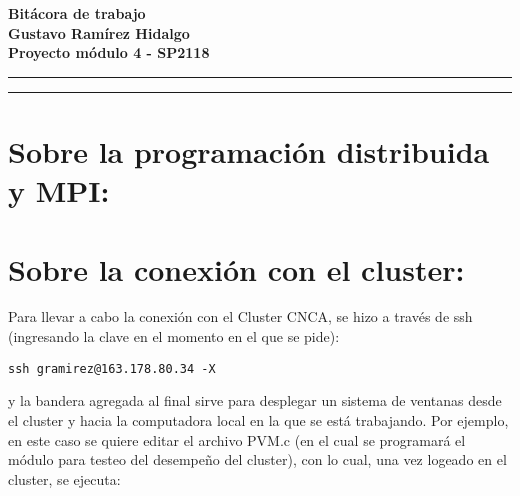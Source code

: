 \documentclass[letter]{article}
\newcommand{\entitle}[1]{
  \vspace{0.3cm}%
  \noindent%
  \textbf{#1}%
  \vspace{0.2cm}%
  \hrule\vspace*{0.5mm}%
  \noindent%
  \rule{\linewidth}{0.5mm}%
  \vspace{0.5cm}%
}%
\begin{document}

\newcommand{\uic}{blue} %
\newcommand{\uim}{\_\_} %
\newcommand{\userinput}[1]{\textcolor{\uic}{\uim#1\uim}}
























\begin{center}
\entitle{Bitácora de trabajo \\ Gustavo Ramírez Hidalgo \\ Proyecto módulo 4 - SP2118}
\end{center}







\section{\normalsize Sobre la programación distribuida y MPI:}



\section{\normalsize Sobre la 
conexión con el cluster:}
Para llevar a cabo la conexión con el Cluster CNCA, se hizo a través de ssh (ingresando la clave en el momento en el que se pide):

\lstset{language=bash}
\begin{lstlisting}
ssh gramirez@163.178.80.34 -X
\end{lstlisting}

y la bandera agregada al final sirve para desplegar un sistema de ventanas desde el cluster y hacia la computadora local en la que se está trabajando. Por ejemplo, en este caso se quiere editar el archivo PVM.c (en el cual se programará el módulo para testeo del desempeño del cluster), con lo cual, una vez logeado en el cluster, se ejecuta:
\end{document}
